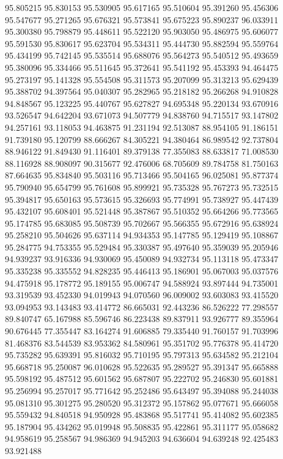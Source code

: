 95.805215
95.830153
95.530905
95.617165
95.510604
95.391260
95.456306
95.547677
95.271265
95.676321
95.573841
95.675223
95.890237
96.033911
95.300380
95.798879
95.448611
95.522120
95.903050
95.486975
95.606077
95.591530
95.830617
95.623704
95.534311
95.444730
95.882594
95.559764
95.434199
95.742145
95.535514
95.688076
95.564273
95.540512
95.493659
95.380096
95.334466
95.511645
95.372641
95.541192
95.453393
94.464475
95.273197
95.141328
95.554508
95.311573
95.207099
95.313213
95.629439
95.388702
94.397564
95.040307
95.282965
95.218182
95.266268
94.910828
94.848567
95.123225
95.440767
95.627827
94.695348
95.220134
93.670916
93.526547
94.642204
93.671073
94.507779
94.838760
94.715517
93.147802
94.257161
93.118053
94.463875
91.231194
92.513087
88.954105
91.186151
91.739180
95.120799
88.666267
84.305221
94.380464
86.989542
92.737804
88.946122
91.849430
91.116401
89.379138
77.355083
88.633817
71.008530
88.116928
88.908097
90.315677
92.476006
68.705609
89.784758
81.750163
87.664635
95.834840
95.503116
95.713466
95.504165
96.025081
95.877374
95.790940
95.654799
95.761608
95.899921
95.735328
95.767273
95.732515
95.394817
95.650163
95.573615
95.326693
95.774991
95.738927
95.447439
95.432107
95.608401
95.521448
95.387867
95.510352
95.664266
95.773565
95.174785
95.683085
95.508739
95.702667
95.566355
95.672916
95.638924
95.258210
95.504626
95.637114
94.934353
95.147785
95.129419
95.108867
95.284775
94.753355
95.529484
95.330387
95.497640
95.359039
95.205946
94.939237
93.916336
94.930069
95.450089
94.932734
95.113118
95.473347
95.335238
95.335552
94.828235
95.446413
95.186901
95.067003
95.037576
94.475918
95.178772
95.189155
95.006747
94.588924
93.897444
94.735001
93.319539
93.452330
94.019943
94.070560
96.009002
93.603083
93.415520
93.094953
93.143483
93.414772
86.665031
92.443236
86.526222
77.298557
89.840747
65.167988
85.596746
86.223438
89.837911
93.926777
89.355964
90.676445
77.355447
83.164274
91.606885
79.335440
91.760157
91.703996
81.468376
83.544539
83.953362
84.580961
95.351702
95.776378
95.414720
95.735282
95.639391
95.816032
95.710195
95.797313
95.634582
95.212104
95.668718
95.250087
96.010628
95.522635
95.289527
95.391347
95.665888
95.598192
95.487512
95.601562
95.687807
95.222702
95.246830
95.601881
95.256994
95.257017
95.771642
95.252486
95.643497
95.394088
95.244038
95.081310
95.301275
95.280520
95.312372
95.157862
95.077671
95.666058
95.559432
94.840518
94.950928
95.483868
95.517741
95.414082
95.602385
95.187904
95.434262
95.019948
95.508835
95.422861
95.311177
95.058682
94.958619
95.258567
94.986369
94.945203
94.636604
94.639248
92.425483
93.921488
